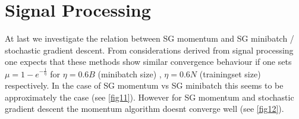 \documentclass{article}
\begin{document}
\section{Signal Processing}

At last we investigate the relation between SG momentum and SG minibatch / stochastic gradient descent.
From considerations derived from signal processing one expects that these methods show similar convergence behaviour
if one sets $\mu = 1 - e^{- \frac{1}{\eta}}$ for $\eta = 0.6 B$ (minibatch size) , $\eta = 0.6 N$ (trainingset size) respectively.
In the case of SG momentum vs SG minibatch this seems to be approximately the case (see \autoref{fig11}).
However for SG momentum and stochastic gradient descent the momentum algorithm doesnt converge well (see \autoref{fig12}).

\FloatBarrier
\end{document}
